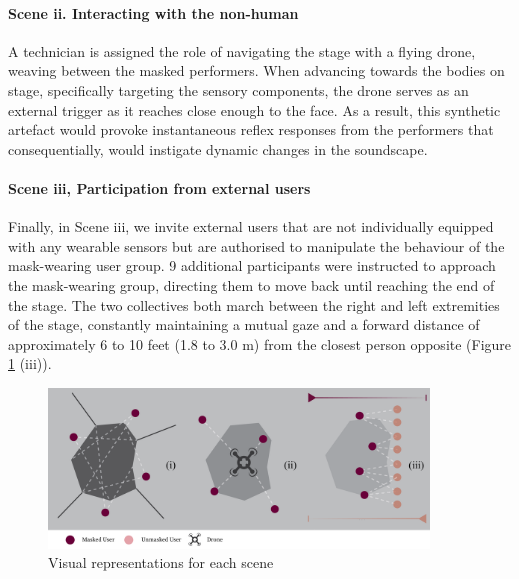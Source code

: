 \paragraph{Scene ii. Interacting with the non-human}

A technician is assigned the role of navigating the stage with a flying drone, weaving between the masked performers. When advancing towards the bodies on stage, specifically targeting the sensory components, the drone serves as an external trigger as it reaches close enough to the face. As a result, this synthetic artefact would provoke instantaneous reflex responses from the performers that consequentially, would instigate dynamic changes in the soundscape.

\paragraph{Scene iii, Participation from external users}

Finally, in Scene iii, we invite external users that are not individually equipped with any wearable sensors but are authorised to manipulate the behaviour of the mask-wearing user group. 9 additional participants were instructed to approach the mask-wearing group, directing them to move back until reaching the end of the stage. The two collectives both march between the right and left extremities of the stage, constantly maintaining a mutual gaze and a forward distance of approximately 6 to 10 feet (1.8 to 3.0 m) from the closest person opposite (Figure \ref{fig1:structure} (iii)).

\begin{figure}[!h]
\centering
\includegraphics[width=0.9\textwidth,keepaspectratio]{Chapters/Figures/adse_ess/scenes_w_keycode.png}
{\caption{Visual representations for each scene}\label{fig1:structure}}
\end{figure}

